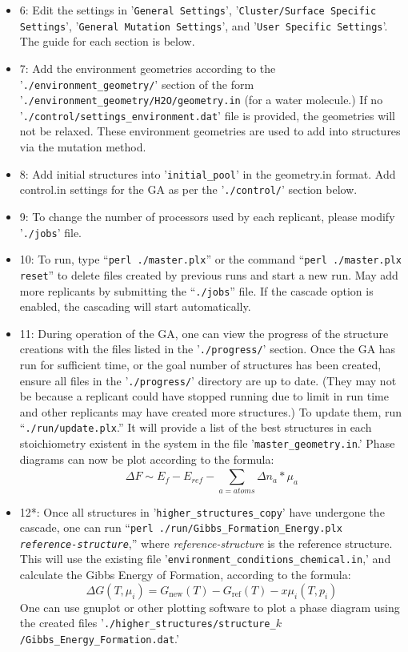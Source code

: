\begin{itemize}
\item 6: Edit the settings in '\texttt{General Settings}', '\texttt{Cluster/Surface Specific Settings}', '\texttt{General Mutation Settings}', and '\texttt{User Specific Settings}'. The guide for each section is below.

\item 7: Add the environment geometries according to the '\texttt{./environment\_geometry/}' section of the form '\texttt{./environment\_geometry/H2O/geometry.in} (for a water molecule.) If no '\texttt{./control/settings\_environment.dat}' file is provided, the geometries will not be relaxed. These environment geometries are used to add into structures via the mutation method.

\item 8: Add initial structures into '\texttt{initial\_pool}' in the geometry.in format. Add control.in settings for the GA as per the '\texttt{./control/}' section below.

\item 9: To change the number of processors used by each replicant, please modify '\texttt{./jobs}' file.

\item 10: To run, type ``\texttt{perl ./master.plx}'' or the command ``\texttt{perl ./master.plx reset}'' to delete files created by previous runs and start a new run. May add more replicants by submitting the ``\texttt{./jobs}'' file. If the cascade option is enabled, the cascading will start automatically.

\item 11: During operation of the GA, one can view the progress of the structure creations with the files listed in the '\texttt{./progress/}' section. Once the GA has run for sufficient time, or the goal number of structures has been created, ensure all files in the '\texttt{./progress/}' directory are up to date. (They may not be because a replicant could have stopped running due to limit in run time and other replicants may have created more structures.) To update them, run ``\texttt{./run/update.plx}.'' It will provide a list of the best structures in each stoichiometry existent in the system in the file '\texttt{master\_geometry.in}.' Phase diagrams can now be plot according to the formula:
$$\Delta F \sim E_f - E_{ref} -\displaystyle\sum_{a=atoms}^{}\Delta n_a * \mu_{a}$$

\item 12*: Once all structures in '\texttt{higher\_structures\_copy}' have undergone the cascade, one can run ``\texttt{perl ./run/Gibbs\_Formation\_Energy.plx {\em {reference-structure}}},'' where {\em {reference-structure}} is the reference structure. This will use the existing file '\texttt{environment\_conditions\_chemical.in},' and calculate the Gibbs Energy of Formation, according to the formula:
$$\Delta G(T,\mu_i) = G_{\mathrm {new}}(T) - G_{\mathrm {ref}}(T) - x\mu_{i}(T,p_{i})$$
One can use gnuplot or other plotting software to plot a phase diagram using the created files '\texttt{./higher\_structures/structure\_$k$/Gibbs\_Energy\_Formation.dat}.'

\end{itemize}


